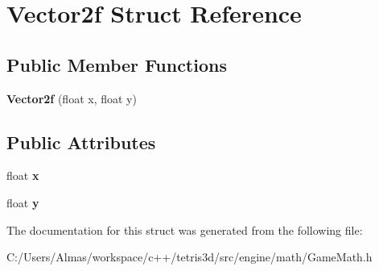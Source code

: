 \hypertarget{struct_vector2f}{\section{Vector2f Struct Reference}
\label{struct_vector2f}
}
\subsection*{Public Member Functions}
\begin{DoxyCompactItemize}
\item 
\hypertarget{struct_vector2f_ae3ff9026b0e1242471678e4f2ed8be0e}{{\bfseries Vector2f} (float x, float y)}\label{struct_vector2f_ae3ff9026b0e1242471678e4f2ed8be0e}

\end{DoxyCompactItemize}
\subsection*{Public Attributes}
\begin{DoxyCompactItemize}
\item 
\hypertarget{struct_vector2f_add58d2378e3a3abdb76cf0ac51c9acfc}{float {\bfseries x}}\label{struct_vector2f_add58d2378e3a3abdb76cf0ac51c9acfc}

\item 
\hypertarget{struct_vector2f_a14874a72597fd358b15f8ba34b999c4d}{float {\bfseries y}}\label{struct_vector2f_a14874a72597fd358b15f8ba34b999c4d}

\end{DoxyCompactItemize}


The documentation for this struct was generated from the following file\-:\begin{DoxyCompactItemize}
\item 
C\-:/\-Users/\-Almas/workspace/c++/tetris3d/src/engine/math/Game\-Math.\-h\end{DoxyCompactItemize}
